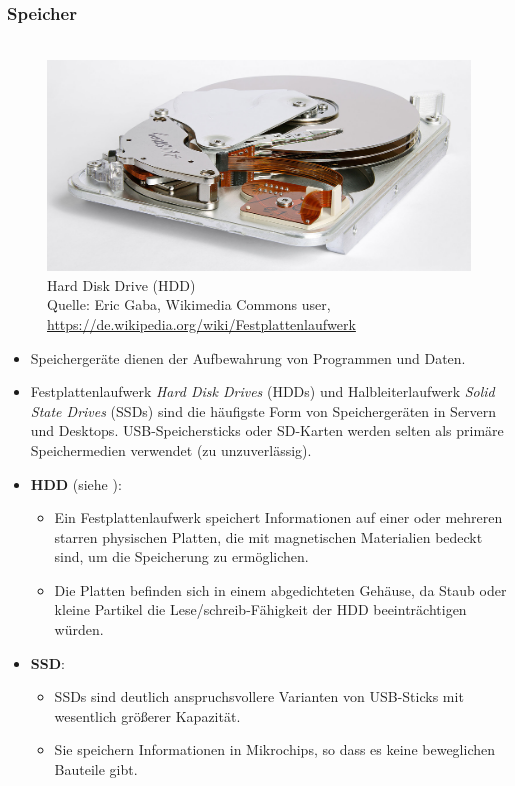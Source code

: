 ~\\
	\subsubsection{Speicher}
	\begin{figure}[h!]
		\centering
		~\\
		\includegraphics[width=0.5\linewidth]{./media/hdd} \\
		\tiny
		Hard Disk Drive (HDD)\\
		Quelle: Eric Gaba, Wikimedia Commons user, \url{https://de.wikipedia.org/wiki/Festplattenlaufwerk}
	\end{figure}
	\begin{itemize}
		\item Speichergeräte dienen der Aufbewahrung von Programmen und Daten.
		\item Festplattenlaufwerk \textit{Hard Disk Drives} (HDDs) und Halbleiterlaufwerk \textit{Solid State Drives} (SSDs) sind die häufigste Form von Speichergeräten in Servern und Desktops. USB-Speichersticks oder SD-Karten werden selten als primäre Speichermedien verwendet (zu unzuverlässig).
		\item \textbf{HDD} (siehe ):
		\begin{itemize}
			\item  Ein Festplattenlaufwerk speichert Informationen auf einer oder mehreren starren physischen Platten, die mit magnetischen Materialien bedeckt sind, um die Speicherung zu ermöglichen.
			\item Die Platten befinden sich in einem abgedichteten Gehäuse, da Staub oder kleine Partikel die Lese/schreib-Fähigkeit der HDD beeinträchtigen würden.
		\end{itemize}
		\item \textbf{SSD}:\begin{itemize}
			\item  SSDs sind deutlich anspruchsvollere Varianten von USB-Sticks mit wesentlich größerer Kapazität.
			\item Sie speichern Informationen in Mikrochips, so dass es keine beweglichen Bauteile gibt.
		\end{itemize}
	\end{itemize}
